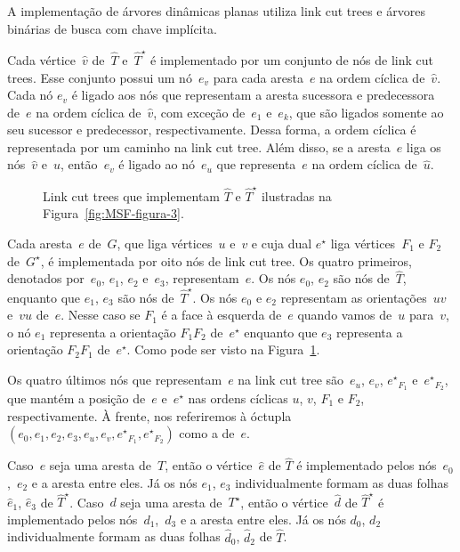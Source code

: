 A implementação de árvores dinâmicas planas utiliza link cut trees e árvores binárias de busca com chave implícita.

Cada vértice~$\hat v$ de~$\hat T$ e~$\hat T^\star$ é implementado por um conjunto de nós de link cut trees.
Esse conjunto possui um nó~$e_v$ para cada aresta~$e$ na ordem cíclica de~$\hat v$.
Cada nó $e_v$ é ligado aos nós que representam a aresta sucessora e predecessora de~$e$ na ordem cíclica de~$\hat v$,
com exceção de~$e_1$ e~$e_k$, que são ligados somente ao seu sucessor e predecessor, respectivamente.
Dessa forma, a ordem cíclica é representada por um caminho na link cut tree.
Além disso, se a aresta~$e$ liga os nós~$\hat v$ e~$\hat u$, então~$e_v$ é ligado ao nó~$e_u$ que representa~$e$ na ordem cíclica de~$\hat u$.

\begin{figure}[htb]
\scalebox{1.3}{
\centering

}
\caption{Link cut trees que implementam $\hat T$ e $\hat T^\star$ ilustradas na Figura~\ref{fig:MSF-figura-3}.}
\label{fig:MSF-figura-4}
\end{figure}

Cada aresta~$e$ de~$G$, que liga vértices~$u$ e~$v$ e cuja dual $e^\star$ liga vértices~$F_1$ e $F_2$ de~$G^\star$, é implementada por oito nós de link cut tree.
Os quatro primeiros, denotados por~$e_0$, $e_1$, $e_2$ e~$e_3$, representam~$e$.
Os nós $e_0$, $e_2$ são nós de~$\hat T$, enquanto que $e_1$, $e_3$ são nós de~$\hat T^\star$.
Os nós $e_0$ e $e_2$ representam as orientações~$uv$ e~$vu$ de~$e$.
Nesse caso se $F_1$ é a face à esquerda de~$e$ quando vamos de~$u$ para~$v$, o nó $e_1$ representa a orientação $F_1F_2$ de~$e^\star$ enquanto que $e_3$ representa a orientação $F_2F_1$ de~$e^\star$.
Como pode ser visto na Figura~\ref{fig:MSF-figura-4}.

Os quatro últimos nós que representam~$e$ na link cut tree são~$e_u$, $e_v$, ${e^\star}_{F_1}$ e~${e^\star}_{F_2}$, que mantém a posição de~$e$ e~$e^\star$ nas ordens cíclicas $u$, $v$, $F_1$ e $F_2$, respectivamente.
À frente, nos referiremos à óctupla $( e_0, e_1, e_2, e_3, e_u, e_v, {e^\star}_{F_1}, {e^\star}_{F_2})$ como a  de~$e$.

Caso~$e$ seja uma aresta de~$T$, então o vértice~$\hat e$ de $\hat T$ é implementado pelos nós~$e_0$,~$e_2$ e a aresta entre eles.
Já os nós $e_1$, $e_3$ individualmente formam as duas folhas $\hat e_1$, $\hat e_3$ de $\hat T^\star$.
Caso~$d$ seja uma aresta de~$T^\star$, então o vértice~$\hat d$ de $\hat T^\star$ é implementado pelos nós~$d_1$,~$d_3$ e a aresta entre eles.
Já os nós $d_0$, $d_2$ individualmente formam as duas folhas $\hat d_0$, $\hat d_2$ de $\hat T$.

